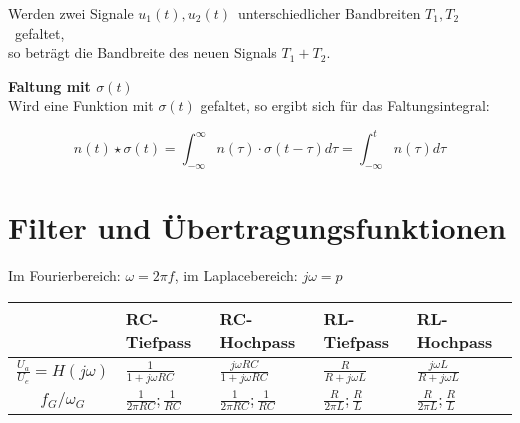 \documentclass[12pt, a4paper, twoside]{scrartcl}
\begin{document}
\begin{framed}
  Werden zwei Signale \(u_1(t), u_2(t)\)~unterschiedlicher Bandbreiten \(T_1, T_2\)~gefaltet,\\
  so beträgt die Bandbreite des neuen Signals \(T_1 + T_2\).
\end{framed}

\textbf{Faltung mit \(\sigma (t)\)}\\

Wird eine Funktion mit \(\sigma (t)\) gefaltet, so ergibt sich für das Faltungsintegral:

\[n(t) \star \sigma (t) = \int_{-\infty}^{\infty} n(\tau) \cdot \sigma(t - \tau) d\tau = \int_{-\infty}^t n(\tau) d\tau\]

\clearpage
\section{Filter und Übertragungsfunktionen}

Im Fourierbereich: \(\omega = 2 \pi f\), im Laplacebereich: \(j\omega = p\)

{
  \centering
  \begin{tabular}{cllll}
    \toprule
    & \textbf{RC-Tiefpass} & \textbf{RC-Hochpass} & \textbf{RL-Tiefpass} & \textbf{RL-Hochpass}\\
    \midrule
    \textbf{\(\frac{U_a}{U_e} = H(j\omega)\)} & \(\frac{1}{1 + j\omega R C}\) & \(\frac{j\omega RC}{1 + j\omega RC}\) & \(\frac{R}{R + j \omega L}\)& \(\frac{j\omega L}{R + j \omega L}\) \\[1em]
    \textbf{\(f_G / \omega_G\)} & \(\frac{1}{2 \pi R C}; \frac{1}{RC}\) & \(\frac{1}{2 \pi R C}; \frac{1}{RC}\) & \(\frac{R}{2 \pi L}; \frac{R}{L}\) & \(\frac{R}{2 \pi L}; \frac{R}{L}\)\\
    \bottomrule
  \end{tabular}
}
\end{document}
